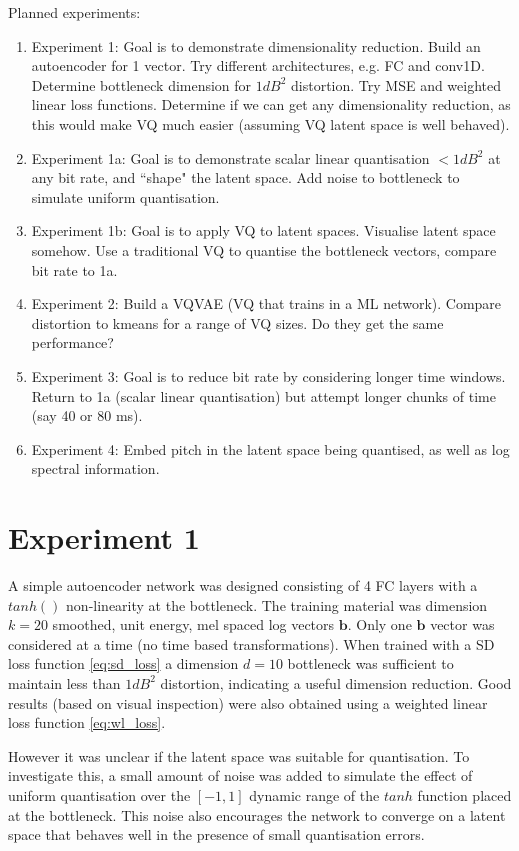 \documentclass{article}
\begin{document}
Planned experiments:
\begin{enumerate}
\item Experiment 1: Goal is to demonstrate dimensionality reduction.  Build an autoencoder for 1 vector.  Try different architectures, e.g. FC and conv1D.  Determine bottleneck dimension for $1dB^2$ distortion.  Try MSE and weighted linear loss functions. Determine if we can get any dimensionality reduction, as this would make VQ much easier (assuming VQ latent space is well behaved).
\item Experiment 1a: Goal is to demonstrate scalar linear quantisation $< 1dB^2$ at any bit rate, and ``shape" the latent space. Add noise to bottleneck to simulate uniform quantisation.
\item Experiment 1b: Goal is to apply VQ to latent spaces. Visualise latent space somehow. Use a traditional VQ to quantise the bottleneck vectors, compare bit rate to 1a.
\item Experiment 2: Build a VQVAE (VQ that trains in a ML network).  Compare distortion to kmeans for a range of VQ sizes.  Do they get the same performance?
\item Experiment 3: Goal is to reduce bit rate by considering longer time windows.  Return to 1a (scalar linear quantisation) but attempt longer chunks of time (say 40 or 80 ms).
\item Experiment 4: Embed pitch in the latent space being quantised, as well as log spectral information.
\end{enumerate}

\section{Experiment 1}

A simple autoencoder network was designed consisting of 4 FC layers with a $tanh()$ non-linearity at the bottleneck.  The training material was dimension $k=20$ smoothed, unit energy, mel spaced log vectors $\mathbf{b}$.  Only one $\mathbf{b}$ vector was considered at a time (no time based transformations). When trained with a SD loss function \ref{eq:sd_loss} a dimension $d=10$ bottleneck was sufficient to maintain less than $1 dB^2$ distortion, indicating a useful dimension reduction.  Good results (based on visual inspection) were also obtained using a weighted linear loss function \ref{eq:wl_loss}.

However it was unclear if the latent space was suitable for quantisation. To investigate this, a small amount of noise was added to simulate the effect of uniform quantisation over the $[-1,1]$ dynamic range of the $tanh$ function placed at the bottleneck.  This noise also encourages the network to converge on a latent space that behaves well in the presence of small quantisation errors.
\end{document}
